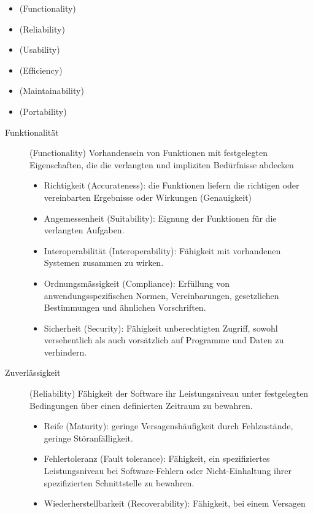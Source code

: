 \ifslides
\begin{itemize}
\item {} (Functionality)
\item {} (Reliability)
\item {} (Usability)
\item {} (Efficiency)
\item {} (Maintainability)
\item {} (Portability)
\end{itemize}
\newpage
\fi
\begin{description}
\item[Funktionalität] (Functionality) Vorhandensein von Funktionen mit
  festgelegten
  Eigenschaften, die die verlangten und impliziten Bedürfnisse abdecken
  \begin{itemize}
  \item Richtigkeit (Accurateness): die Funktionen liefern die richtigen oder
  vereinbarten
  Ergebnisse oder Wirkungen (Genauigkeit)
\item Angemessenheit (Suitability): Eignung der Funktionen für die verlangten
  Aufgaben.
\item Interoperabilität (Interoperability): Fähigkeit mit vorhandenen Systemen
  zu\-sam\-men zu wirken.
\item Ordnungsmässigkeit (Compliance): Erfüllung von anwendungsspezifischen
  Normen, Vereinbarungen, gesetzlichen Bestimmungen und ähnlichen
  Vorschriften.
\item Sicherheit (Security): Fähigkeit unberechtigten Zugriff, sowohl
  versehentlich als auch vorsätzlich auf Programme und Daten zu verhindern.
  \end{itemize}
\ifslides
\newpage
\fi
\item[Zuverlässigkeit] (Reliability) Fähigkeit der Software ihr
  Leistungs\-ni\-veau unter festgelegten Bedingungen über einen definierten
  Zeitraum zu bewahren.
  \begin{itemize}
  \item Reife (Maturity): geringe Versagenshäufigkeit durch Fehlzustände,
  geringe Stör\-an\-fäl\-lig\-keit.
  \item Fehlertoleranz (Fault tolerance): Fähigkeit, ein spezifiziertes
  Leistungs\-ni\-veau bei Software-Fehlern oder Nicht-Einhaltung ihrer
  spezifizierten Schnittstelle zu bewahren.
\item Wiederherstellbarkeit (Recoverability): Fähigkeit, bei einem Versagen

\end{itemize}
\end{description}
